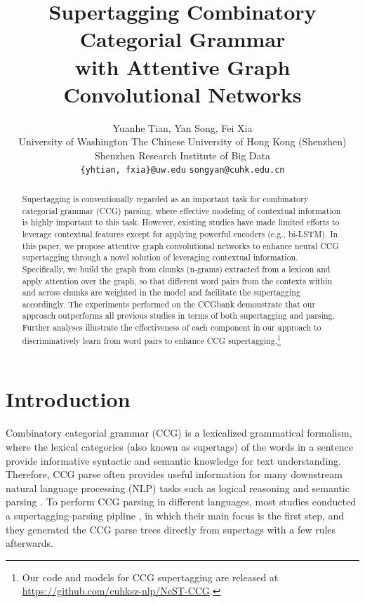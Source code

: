 \documentclass[11pt,a4paper]{article}
\title{Supertagging Combinatory Categorial Grammar\\with Attentive Graph Convolutional Networks}
\author{
    Yuanhe Tian, \hspace{0.2cm}
    Yan Song, \hspace{0.2cm}
    Fei Xia\\
University of Washington \hspace{0.4cm}
The Chinese University of Hong Kong (Shenzhen)\\
    Shenzhen Research Institute of Big Data \\
\texttt{\{yhtian, fxia\}@uw.edu} \hspace{0.4cm}
    \texttt{songyan@cuhk.edu.cn} \\ \hspace{0.4cm}
}
\date{}
\begin{document}
\maketitle

\renewcommand{\thefootnote}{\fnsymbol{footnote}}

\renewcommand{\thefootnote}{\arabic{footnote}}


\begin{abstract}

Supertagging is conventionally regarded as an important task for combinatory categorial grammar (CCG) parsing, where effective modeling of contextual information is highly important to this task.
However, existing studies have made limited efforts to leverage contextual features except for applying powerful encoders (e.g., bi-LSTM).
In this paper, we propose attentive graph convolutional networks to enhance neural CCG supertagging through a novel solution of leveraging contextual information.
Specifically, we build the graph from chunks (n-grams) extracted from a lexicon and apply attention over the graph, so that different 
word pairs
from the contexts within and across chunks are weighted in the model and facilitate the supertagging accordingly.
The experiments performed on the CCGbank demonstrate that our approach outperforms all previous studies
in terms of both supertagging and parsing.
Further analyses illustrate the effectiveness of each component in our approach to discriminatively learn from word pairs to enhance CCG supertagging.\footnote{Our code and models for CCG supertagging are released at \url{https://github.com/cuhksz-nlp/NeST-CCG}.}

\end{abstract}


\section{Introduction} \label{intro}







Combinatory categorial grammar (CCG) is a lexicalized grammatical formalism, where the lexical categories (also known as supertags) of the words in a sentence provide informative syntactic and semantic knowledge for text understanding.
Therefore, CCG parse often provides useful information for many downstream natural language processing (NLP) tasks such as logical reasoning \cite{yoshikawa-etal-2018-consistent} and semantic parsing \cite{beschke-2019-exploring}.
To perform CCG parsing in different languages,
most studies conducted a supertagging-parsing pipline \cite{clark-curran-2007-wide,kummerfeld-etal-2010-faster,song2012construction,lewis-steedman-2014-improved,huang2015chinese, xu-etal-2015-ccg, lewis-etal-2016-lstm, vaswani-etal-2016-supertagging, yoshikawa-etal-2017-ccg}, in which their main focus is the first step, and they generated the CCG parse trees directly from supertags with a few rules afterwards.
\end{document}
